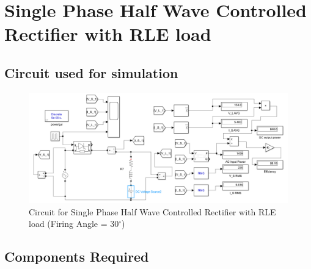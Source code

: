 \section{Single Phase Half Wave Controlled Rectifier with RLE load}

\subsection{Circuit used for simulation}

\begin{figure}[h]
    \centering
    \includegraphics[width=1.0\textwidth]{images/experiment-1/circuit-diagram-experiment-07.png}
    \caption{Circuit for Single Phase Half Wave Controlled Rectifier with RLE load (Firing Angle = 30$ ^\circ $)}
    \label{Fig_simulation_circuit_single-phase-half-wave-controlled-rectifier-with-RLE-load}
\end{figure}

\subsection{Components Required}

